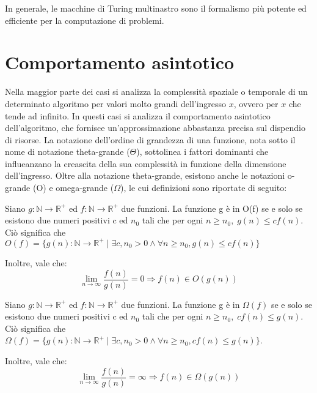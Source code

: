  In generale, le macchine di Turing multinastro sono il formalismo più potente ed efficiente per la computazione di problemi.


  \section{Comportamento asintotico}
  Nella maggior parte dei casi si analizza la complessità spaziale o temporale di un determinato algoritmo per valori molto grandi dell'ingresso \(x\), ovvero per \(x\) che tende ad infinito. In questi casi si analizza il comportamento asintotico dell'algoritmo, che fornisce un'approssimazione abbastanza precisa sul dispendio di risorse. La notazione dell'ordine di grandezza di una funzione, nota sotto il nome di notazione theta-grande (\(\Theta \)), sottolinea i fattori dominanti che influeanzano la creascita della sua complessità in funzione della dimensione dell'ingresso. Oltre alla notazione theta-grande, esistono anche le notazioni o-grande (O) e omega-grande (\(\Omega \)), le cui definizioni sono riportate di seguito:

  \begin{definition}[Notazione O]
    Siano \(g:\mathbb{N}\to\mathbb{R}^+\) ed \(f:\mathbb{N}\to\mathbb{R}^+\) due funzioni. La funzione g è in O(f) se e solo se esistono due numeri positivi c ed \(n_0\) tali che per ogni \(n\ge n_0,\; g(n)\le cf(n)\). Ciò significa che \(O(f)=\{g(n):\mathbb{N}\to\mathbb{R}^+ \;|\; \exists c,n_0>0 \land \forall n\ge n_0, g(n)\le cf(n)\}\)

    Inoltre, vale che:
    \begin{equation*}
      \lim_{n\to \infty}\frac{f(n)}{g(n)}=0 \Rightarrow f(n)\in O(g(n))
    \end{equation*}
  \end{definition}

  \begin{definition}
    Siano \(g:\mathbb{N}\to\mathbb{R}^+\) ed \(f:\mathbb{N}\to\mathbb{R}^+\) due funzioni. La funzione g è in \(\Omega(f)\) se e solo se esistono due numeri positivi c ed \(n_0\) tali che per ogni \(n\ge n_0,\; cf(n)\le g(n)\). Ciò significa che \(\Omega(f)=\{g(n):\mathbb{N}\to\mathbb{R}^+ \;|\; \exists c,n_0>0 \land \forall n\ge n_0, cf(n)\le g(n)\}\).

    Inoltre, vale che:
    \begin{equation*}
      \lim_{n\to \infty}\frac{f(n)}{g(n)}=\infty \Rightarrow f(n)\in \Omega(g(n))
    \end{equation*}    
  \end{definition}  

